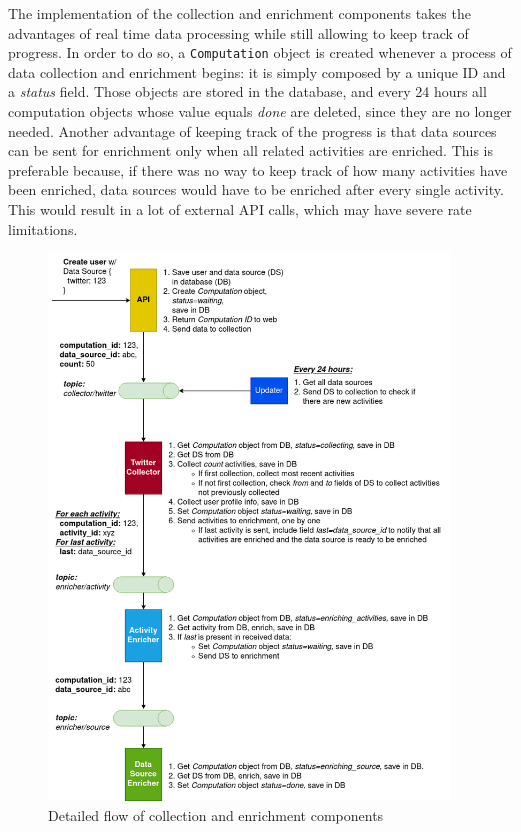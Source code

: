 The implementation of the collection and enrichment components takes the advantages of real time data processing while still allowing to keep track of progress. In order to do so, a \texttt{Computation} object is created whenever a process of data collection and enrichment begins: it is simply composed by a unique ID and a \emph{status} field. Those objects are stored in the database, and every 24 hours all computation objects whose value equals \emph{done} are deleted, since they are no longer needed. Another advantage of keeping track of the progress is that data sources can be sent for enrichment only when all related activities are enriched. This is preferable because, if there was no way to keep track of how many activities have been enriched, data sources would have to be enriched after every single activity. This would result in a lot of external API calls, which may have severe rate limitations.

\begin{figure}[h!]
\centering
\includegraphics[width=0.95\textwidth]{img/EnrichmentFlow.png}
\caption{Detailed flow of collection and enrichment components}
\label{fig:enrichment_flow}
\end{figure}

